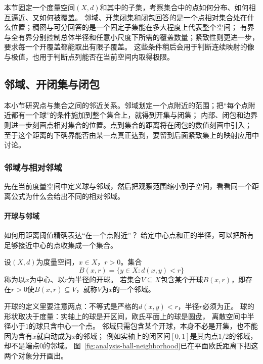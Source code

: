 本节固定一个度量空间$(X,d)$和其中的子集，考察集合中的点如何分布、如何相互逼近、又如何被覆盖。
邻域、开集闭集和闭包回答的是一个点相对集合处在什么位置；稠密与可分回答的是一个固定子集能在多大程度上代表整个空间；
有界与全有界分别控制总体半径和任意小尺度下所需的覆盖数量；紧致性则更进一步，要求每一个开覆盖都能取出有限子覆盖。
这些条件稍后会用于判断连续映射的像与极值，也用于判断点列能否在当前空间内取得极限。

\subsection{邻域、开闭集与闭包}
\label{sec:metric-local-set-relations}

本小节研究点与集合之间的邻近关系。邻域划定一个点附近的范围；把“每个点附近都有一个球”的条件施加到整个集合上，就得到开集与闭集；
内部、闭包和边界则进一步刻画点相对集合的位置。点到集合的距离将在闭包的数值刻画中引入；
至于这个距离的下确界能否由某一点真正达到，要留到后面紧致集上的映射应用中讨论。

\subsubsection{邻域与相对邻域}
\label{sec:metric-neighborhoods}

先在当前度量空间中定义球与邻域，然后把观察范围缩小到子空间，看看同一个距离公式为什么会给出不同的相对邻域。

\paragraph{开球与邻域}

如何用距离阈值精确表达“在一个点附近”？
给定中心点和正的半径，可以把所有足够接近中心的点收集成一个集合。

\begin{definition}[开球与邻域]
\label{def:metric-open-ball}
设$(X,d)$为度量空间，$x\in X$，$r>0$。集合
\[
  B(x,r)=\{y\in X:d(x,y)<r\}
\]
称为以$x$为中心、以$r$为半径的开球。
若集合$V\subseteq X$包含某个开球$B(x,r)$，即存在$r>0$使$B(x,r)\subseteq V$，就称$V$为$x$的一个邻域。
\end{definition}

开球的定义里要注意两点：不等式是严格的$d(x,y)<r$，半径$r$必须为正。
球的形状取决于度量：实轴上的球是开区间，欧氏平面上的球是圆盘，
离散空间中半径小于$1$的球只含中心一个点。
邻域只需包含某个开球，本身不必是开集，也不能因为含有$x$就自动成为$x$的邻域；
例如实轴上的闭区间$[0,1]$是其内点$1/2$的邻域，却不是端点$0$的邻域。
图~\ref{fig:analysis-ball-neighborhood}已在平面欧氏距离下把这两个对象分开画出。

